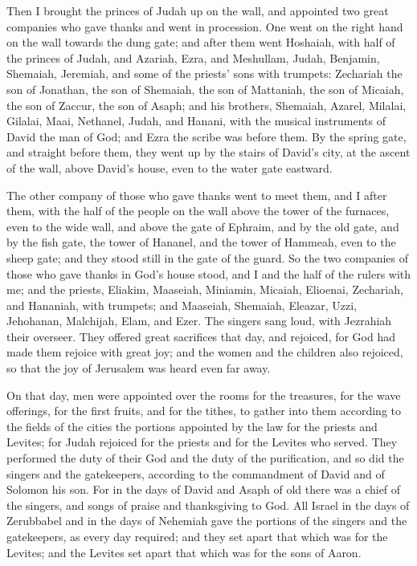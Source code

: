  Then I brought the princes of Judah up on the wall, and
appointed two great companies who gave thanks and went in procession.
One went on the right hand on the wall towards the dung gate;
 and after them went Hoshaiah, with half of the princes
of Judah,  and Azariah, Ezra, and Meshullam,
 Judah, Benjamin, Shemaiah, Jeremiah,  and
some of the priests' sons with trumpets: Zechariah the son of Jonathan,
the son of Shemaiah, the son of Mattaniah, the son of Micaiah, the son
of Zaccur, the son of Asaph;  and his brothers, Shemaiah,
Azarel, Milalai, Gilalai, Maai, Nethanel, Judah, and Hanani, with the
musical instruments of David the man of God; and Ezra the scribe was
before them.  By the spring gate, and straight before
them, they went up by the stairs of David's city, at the ascent of the
wall, above David's house, even to the water gate eastward.

 The other company of those who gave thanks went to meet
them, and I after them, with the half of the people on the wall above
the tower of the furnaces, even to the wide wall,  and
above the gate of Ephraim, and by the old gate, and by the fish gate,
the tower of Hananel, and the tower of Hammeah, even to the sheep gate;
and they stood still in the gate of the guard.  So the
two companies of those who gave thanks in God's house stood, and I and
the half of the rulers with me;  and the priests,
Eliakim, Maaseiah, Miniamin, Micaiah, Elioenai, Zechariah, and Hananiah,
with trumpets;  and Maaseiah, Shemaiah, Eleazar, Uzzi,
Jehohanan, Malchijah, Elam, and Ezer. The singers sang loud, with
Jezrahiah their overseer.  They offered great sacrifices
that day, and rejoiced, for God had made them rejoice with great joy;
and the women and the children also rejoiced, so that the joy of
Jerusalem was heard even far away.

 On that day, men were appointed over the rooms for the
treasures, for the wave offerings, for the first fruits, and for the
tithes, to gather into them according to the fields of the cities the
portions appointed by the law for the priests and Levites; for Judah
rejoiced for the priests and for the Levites who served. 
They performed the duty of their God and the duty of the purification,
and so did the singers and the gatekeepers, according to the commandment
of David and of Solomon his son.  For in the days of
David and Asaph of old there was a chief of the singers, and songs of
praise and thanksgiving to God.  All Israel in the days
of Zerubbabel and in the days of Nehemiah gave the portions of the
singers and the gatekeepers, as every day required; and they set apart
that which was for the Levites; and the Levites set apart that which was
for the sons of Aaron.

